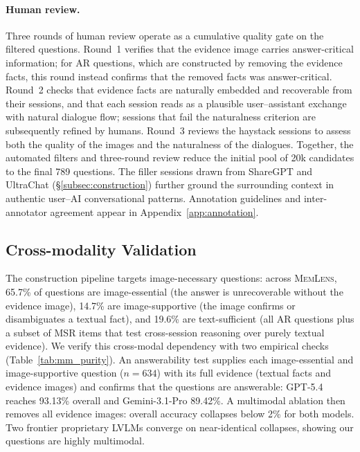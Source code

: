 \documentclass{llmxive}
\providecommand{\bench}{\textsc{MemLens}}
\begin{document}
\paragraph{Human review.}
Three rounds of human review operate as a cumulative quality gate on the filtered questions. Round~1 verifies that the evidence image carries answer-critical information; for AR questions, which are constructed by removing the evidence facts, this round instead confirms that the removed facts was answer-critical. Round~2 checks that evidence facts are naturally embedded and recoverable from their sessions, and that each session reads as a plausible user--assistant exchange with natural dialogue flow; sessions that fail the naturalness criterion are subsequently refined by humans. Round~3 reviews the haystack sessions to assess both the quality of the images and the naturalness of the dialogues. Together, the automated filters and three-round review reduce the initial pool of 20k candidates to the final 789 questions. The filler sessions drawn from ShareGPT and UltraChat (\S\ref{subsec:construction}) further ground the surrounding context in authentic user--AI conversational patterns. Annotation guidelines and inter-annotator agreement appear in Appendix~\ref{app:annotation}.

\subsection{Cross-modality Validation}
\label{subsec:cross_modality}
The construction pipeline targets image-necessary questions: across \bench{}, 65.7\% of questions are image-essential (the answer is unrecoverable without the evidence image), 14.7\% are image-supportive (the image confirms or disambiguates a textual fact), and 19.6\% are text-sufficient (all AR questions plus a subset of MSR items that test cross-session reasoning over purely textual evidence). We verify this cross-modal dependency with two empirical checks (Table~\ref{tab:mm_purity}). An answerability test supplies each image-essential and image-supportive question ($n = 634$) with its full evidence (textual facts and evidence images) and confirms that the questions are answerable: GPT-5.4 reaches 93.13\% overall and Gemini-3.1-Pro 89.42\%. A multimodal ablation then removes all evidence images: overall accuracy collapses below 2\% for both models. Two frontier proprietary LVLMs converge on near-identical collapses, showing our questions are highly multimodal.
\end{document}
